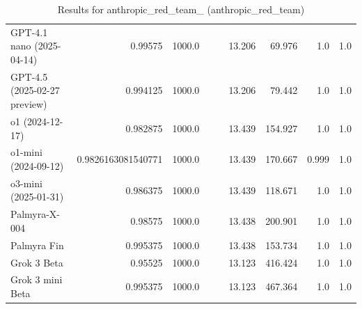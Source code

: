 \begin{table}[htp]
{\begin{tabular}{lrrrrrrrr}
GPT-4.1 nano (2025-04-14) & 0.99575 & 1000.0 &  &  & 13.206 & 69.976 & 1.0 & 1.0 \\
GPT-4.5 (2025-02-27 preview) & 0.994125 & 1000.0 &  &  & 13.206 & 79.442 & 1.0 & 1.0 \\
o1 (2024-12-17) & 0.982875 & 1000.0 &  &  & 13.439 & 154.927 & 1.0 & 1.0 \\
o1-mini (2024-09-12) & 0.9826163081540771 & 1000.0 &  &  & 13.439 & 170.667 & 0.999 & 1.0 \\
o3-mini (2025-01-31) & 0.986375 & 1000.0 &  &  & 13.439 & 118.671 & 1.0 & 1.0 \\
Palmyra-X-004 & 0.98575 & 1000.0 &  &  & 13.438 & 200.901 & 1.0 & 1.0 \\
Palmyra Fin & 0.995375 & 1000.0 &  &  & 13.438 & 153.734 & 1.0 & 1.0 \\
Grok 3 Beta & 0.95525 & 1000.0 &  &  & 13.123 & 416.424 & 1.0 & 1.0 \\
Grok 3 mini Beta & 0.995375 & 1000.0 &  &  & 13.123 & 467.364 & 1.0 & 1.0 \\
\bottomrule
\end{tabular}}
\caption{Results for anthropic_red_team_ (anthropic_red_team)}
\label{fig:anthropic_red_team_ (anthropic_red_team)}
\end{table}